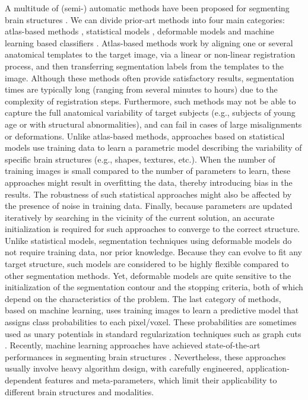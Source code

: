 \documentclass[twoside,fleqn,espcrc2]{elsarticle}
\begin{document}
A multitude of (semi-) automatic methods have been proposed for segmenting brain structures \cite{Dolz2015REV}. We can divide prior-art methods into four main categories: atlas-based methods \cite{lotjonen2010fast,wang2013multi}, statistical models \cite{babalola20083d,rao2008hierarchical}, deformable models \cite{yang20043d} and machine learning based classifiers \cite{powell2008registration,dolz2016supervised}. Atlas-based methods work by aligning one or several anatomical templates to the target image, via a linear or non-linear registration process, and then transferring segmentation labels from the templates to the image. Although these methods often provide satisfactory results, segmentation times are typically long (ranging from several minutes to hours) due to the complexity of registration steps. Furthermore, such methods may not be able to capture the full anatomical variability of target subjects (e.g., subjects of young age or with structural abnormalities), and can fail in cases of large misalignments or deformations. Unlike atlas-based methods, approaches based on statistical models use training data to learn a parametric model describing the variability of specific brain structures (e.g., shapes, textures, etc.). When the number of training images is small compared to the number of parameters to learn, these approaches might result in overfitting the data, thereby introducing bias in the results. The robustness of such statistical approaches might also be affected by the presence of noise in training data. Finally, because parameters are updated iteratively by searching in the vicinity of the current solution, an accurate initialization is required for such approaches to converge to the correct structure. Unlike statistical models, segmentation techniques using deformable models do not require training data, nor prior knowledge. Because they can evolve to fit any target structure, such models are considered to be highly flexible compared to other segmentation methods. Yet, deformable models are quite sensitive to the initialization of the segmentation contour and the stopping criteria, both of which depend on the characteristics of the problem. The last category of methods, based on machine learning, uses training images to learn a predictive model that assigns class probabilities to each pixel/voxel. These probabilities are sometimes used as unary potentials in standard regularization techniques such as graph cuts \cite{shakeri2016sub}. Recently, machine learning approaches have achieved state-of-the-art performances in segmenting brain structures \cite{Dolz2015REV,powell2008registration}. Nevertheless, these approaches usually involve heavy algorithm design, with carefully engineered, application-dependent features and meta-parameters, which limit their applicability to different brain structures and modalities.
\end{document}
